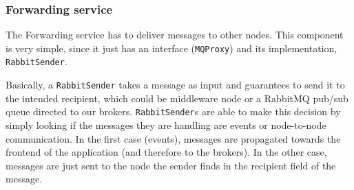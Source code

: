 \subsubsection{Forwarding service}
The Forwarding service has to deliver messages to other nodes. This component
is very simple, since it just has an interface (\texttt{MQProxy}) and its
implementation, \texttt{RabbitSender}.

Basically, a \texttt{RabbitSender} takes a message as input and guarantees to
send it to the intended recipient, which could be middleware node or a
RabbitMQ pub/sub queue directed to our brokers.
\texttt{RabbitSender}s are able to make this decision by simply looking if the
messages they are handling are events or node-to-node communication. In the
first case (events), messages are propagated towards the frontend of the
application (and therefore to the brokers). In the other case, messages are
just sent to the node the sender finds in the recipient field of the message.

